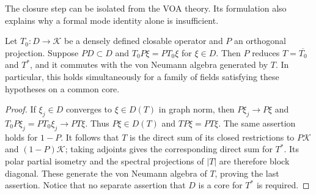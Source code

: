 The closure step can be isolated from the VOA theory.  Its formulation
also explains why a formal mode identity alone is insufficient.

\begin{lemma}
\label{lem:analytic-graph-reduction}
Let $T_0:D\to\mathcal K$ be a densely defined closable operator and
$P$ an orthogonal projection.  Suppose $PD\subset D$ and
$T_0P\xi=PT_0\xi$ for $\xi\in D$.  Then $P$ reduces
$T=\overline{T_0}$ and $T^*$, and it commutes with the von Neumann
algebra generated by $T$.  In particular, this holds simultaneously
for a family of fields satisfying these hypotheses on a common core.
\end{lemma}
\begin{proof}
If $\xi_j\in D$ converges to $\xi\in D(T)$ in graph norm, then
$P\xi_j\to P\xi$ and $T_0P\xi_j=PT_0\xi_j\to PT\xi$.
Thus $P\xi\in D(T)$ and $TP\xi=PT\xi$.  The same assertion holds
for $1-P$.  It follows that $T$ is the direct sum of its closed
restrictions to $P\mathcal K$ and $(1-P)\mathcal K$; taking adjoints
gives the corresponding direct sum for $T^*$.  Its polar partial
isometry and the spectral projections of $|T|$ are therefore block
diagonal.  These generate the von Neumann algebra of $T$, proving the
last assertion.  Notice that no separate assertion that $D$ is a core
for $T^*$ is required.
\end{proof}

